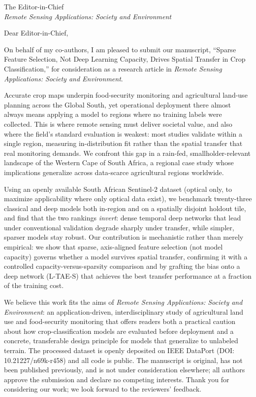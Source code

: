 \documentclass[11pt]{letter}
\begin{document}
\begin{letter}{The Editor-in-Chief \\ \textit{Remote Sensing Applications: Society and Environment} }

\opening{Dear Editor-in-Chief,}

On behalf of my co-authors, I am pleased to submit our manuscript, ``Sparse Feature Selection, Not Deep Learning Capacity, Drives Spatial Transfer in Crop Classification,'' for consideration as a research article in \textit{Remote Sensing Applications: Society and Environment}.

Accurate crop maps underpin food-security monitoring and agricultural land-use planning across the Global South, yet operational deployment there almost always means applying a model to regions where no training labels were collected. This is where remote sensing must deliver societal value, and also where the field's standard evaluation is weakest: most studies validate within a single region, measuring in-distribution fit rather than the spatial transfer that real monitoring demands. We confront this gap in a rain-fed, smallholder-relevant landscape of the Western Cape of South Africa, a regional case study whose implications generalize across data-scarce agricultural regions worldwide.

Using an openly available South African Sentinel-2 dataset (optical only, to maximize applicability where only optical data exist), we benchmark twenty-three classical and deep models both in-region and on a spatially disjoint holdout tile, and find that the two rankings \emph{invert}: dense temporal deep networks that lead under conventional validation degrade sharply under transfer, while simpler, sparser models stay robust. Our contribution is mechanistic rather than merely empirical: we show that sparse, axis-aligned feature selection (not model capacity) governs whether a model survives spatial transfer, confirming it with a controlled capacity-versus-sparsity comparison and by grafting the bias onto a deep network (L-TAE-S) that achieves the best transfer performance at a fraction of the training cost.

We believe this work fits the aims of \textit{Remote Sensing Applications: Society and Environment}: an application-driven, interdisciplinary study of agricultural land use and food-security monitoring that offers readers both a practical caution about how crop-classification models are evaluated before deployment and a concrete, transferable design principle for models that generalize to unlabeled terrain. The processed dataset is openly deposited on IEEE DataPort (DOI: 10.21227/n69k-r458) and all code is public. The manuscript is original, has not been published previously, and is not under consideration elsewhere; all authors approve the submission and declare no competing interests. Thank you for considering our work; we look forward to the reviewers' feedback.


\end{letter}
\end{document}
